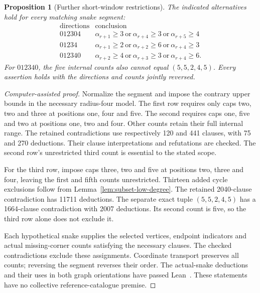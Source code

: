 \documentclass[11pt,a4paper]{article}
\newtheorem{proposition}[theorem]{Proposition}
\theoremstyle{definition}
\theoremstyle{remark}
\begin{document}
\begin{proposition}[Further short-window restrictions]\label{prop:recent-counts}
The indicated alternatives hold for every matching snake segment:
\[
\begin{array}{c|l}
\text{directions}&\text{conclusion}\\\hline
012304&\alpha_{r+1}\ge3\ \text{or}\ \alpha_{r+4}\ge3\ \text{or}\ \alpha_{r+5}\ge4\\
01234&\alpha_{r+1}\ge2\ \text{or}\ \alpha_{r+2}\ge6\ \text{or}\ \alpha_{r+4}\ge3\\
012340&\alpha_{r+2}\ge4\ \text{or}\ \alpha_{r+3}\ge3\ \text{or}\ \alpha_{r+4}\ge6.
\end{array}
\]
For $012340$, the five internal counts also cannot equal $(5,5,2,4,5)$.
Every assertion holds with the directions and counts jointly reversed.
\end{proposition}
\begin{proof}[Computer-assisted proof]
Normalize the segment and impose the contrary upper bounds in the necessary
radius-four model. The first row requires only caps two, two and three at
positions one, four and five. The second requires caps one, five and two at
positions one, two and four. Other counts retain their full internal range.
The retained contradictions use respectively 120 and 441 clauses, with 75
and 270 deductions. Their clause interpretations and refutations are checked.
The second row's unrestricted third count is essential to the stated scope.

For the third row, impose caps three, two and five at positions two, three
and four, leaving the first and fifth counts unrestricted. Thirteen added
cycle exclusions follow from Lemma~\ref{lem:subset-low-degree}. The retained
2040-clause contradiction has 11711 deductions. The separate exact tuple
$(5,5,2,4,5)$ has a 1664-clause contradiction with 2007 deductions.
Its second count is five, so the third row alone does not exclude it.

Each hypothetical snake supplies the selected vertices, endpoint indicators
and actual missing-corner counts satisfying the necessary clauses. The
checked contradictions exclude these assignments. Coordinate transport
preserves all counts; reversing the segment reverses their order. The
actual-snake deductions and their uses in both graph orientations have
passed Lean~\cite{recoveryarchive,criticalcountarchive}. These statements
have no collective reference-catalogue premise.
\end{proof}
\end{document}
